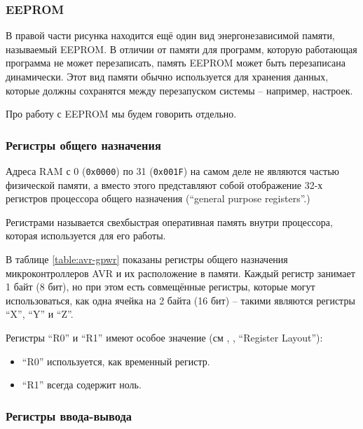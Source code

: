 \documentclass[../sparc.tex]{subfiles}
\begin{document}
\subsubsection{EEPROM}

В правой части рисунка находится ещё один вид энергонезависимой памяти,
называемый \gls{EEPROM}.  В отличии от памяти для программ, которую работающая
программа не может перезаписать, память EEPROM может быть перезаписана
динамически.  Этот вид памяти обычно используется для хранения данных, которые
должны сохранятся между перезапуском системы -- например, настроек.

Про работу с EEPROM мы будем говорить отдельно.

\subsubsection{Регистры общего назначения}

Адреса \gls{RAM} с 0 (\texttt{0x0000}) по 31 (\texttt{0x001F})
на самом деле не являются частью физической памяти, а вместо этого представляют
собой отображение 32-х регистров процессора общего назначения (``general purpose
registers''.)

Регистрами называется свехбыстрая оперативная память внутри процессора, которая
используется для его работы.

В таблице \ref{table:avr-gpwr} показаны регистры общего назначения
микроконтроллеров AVR и их расположение в памяти.  Каждый регистр занимает 1
байт (8 бит), но при этом есть совмещённые регистры, которые могут
использоваться, как одна ячейка на 2 байта (16 бит) -- такими являются регистры
``X'', ``Y'' и ``Z''.

Регистры ``R0'' и ``R1'' имеют особое значение (см \cite{avr:gcc}, , ``Register
Layout''):
\begin{itemize}
\item ``R0'' используется, как временный регистр.
\item ``R1'' всегда содержит ноль.
\end{itemize}

\subsubsection{Регистры ввода-вывода}
\end{document}
